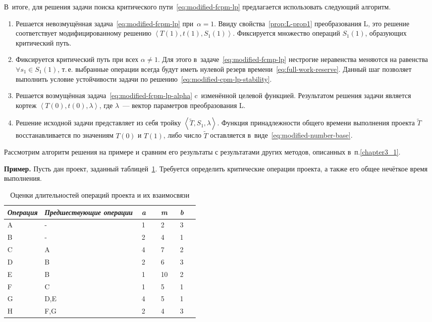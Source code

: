 В~итоге, для решения задачи поиска критического пути~\eqref{eq:modified-fcpm-lp} предлагается использовать следующий алгоритм.
\begin{enumerate}
  \item Решается невозмущённая задача~\eqref{eq:modified-fcpm-lp} при~$\alpha=1$. Ввиду свойства~\ref{prop:L-prop1} преобразования L, это решение соответствует модифицированному решению $\left \langle T\left(1\right), t\left(1\right), S_1\left(1\right) \right \rangle$. Фиксируется множество операций $S_1\left(1\right)$, образующих критический путь.
  \item Фиксируется критический путь при всех $\alpha \neq 1$. Для этого в~задаче~\eqref{eq:modified-fcmp-lp} нестрогие неравенства меняются на равенства $\forall s_1 \in S_1\left(1\right)$, т.\,е. выбранные операции всегда будут иметь нулевой резерв времени~\eqref{eq:full-work-reserve}. Данный шаг позволяет выполнить условие устойчивости задачи по решению~\eqref{eq:modified-cpm-lp-stability}.
  \item Решается возмущённая задача~\eqref{eq:modified-fcpm-lp-alpha} c~изменённой целевой функцией. Результатом решения задачи является кортеж $\left \langle T\left(0\right), t\left(0\right), \lambda \right \rangle$, где $\lambda$~--- вектор параметров преобразования L.
  \item Решение исходной задачи представляет из себя тройку $\left \langle \tilde T, S_1, \lambda \right \rangle$. Функция принадлежности общего времени выполнения проекта $\tilde T$ восстанавливается по значениям $T\left(0\right)$ и $T\left(1\right)$, либо число $\tilde T$ оставляется в~виде~\eqref{eq:modified-number-base}.
\end{enumerate}
  
Рассмотрим алгоритм решения на примере и сравним его результаты с результатами других методов, описанных в~п.\ref{chapter3_1}.

\textbf{Пример.} Пусть дан проект, заданный таблицей~\ref{t:sample-project-estimates}. Требуется определить критические операции проекта, а также его общее нечёткое время выполнения.

\begin{table}[b!]
\caption{Оценки длительностей операций проекта и их взаимосвязи}
\label{t:sample-project-estimates}
\begin{center}
\begin{tabularx}{0.8\textwidth}{|p{0.15\linewidth}|X|p{0.1\linewidth}|p{0.1\linewidth}|p{0.1\linewidth}|}
	\hline
		\centering \textit{Операция} & \centering \textit{Предшествующие операции} & \centering \textit{a} & \centering \textit{m} & \centering \textit{b} \tabularnewline	\hline
	\hline
		A & -   & 1 & 2  & 3 \tabularnewline \hline
		B & -   & 2 & 4  & 1 \tabularnewline \hline
		C & A   & 4 & 7  & 2 \tabularnewline \hline
		D & B   & 2 & 6  & 3 \tabularnewline \hline
		E & B   & 1 & 10 & 2 \tabularnewline \hline
		F & C   & 1 & 5  & 1 \tabularnewline \hline
		G & D,E & 4 & 5  & 1 \tabularnewline \hline
		H & F,G & 2 & 4  & 3 \tabularnewline
    \hline
\end{tabularx}
\end{center}
\end{table}

